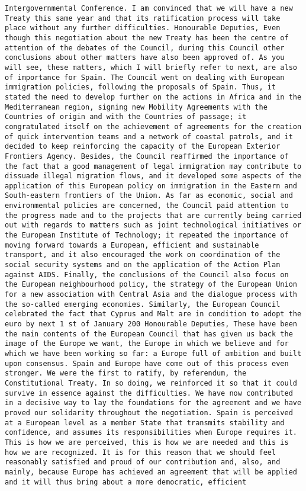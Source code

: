 \documentclass[
]{article}
\begin{document}
\begin{verbatim}
Intergovernmental Conference. I am convinced that we will have a new Treaty this same year and that its ratification process will take place without any further difficulties. Honourable Deputies, Even though this negotiation about the new Treaty has been the centre of attention of the debates of the Council, during this Council other conclusions about other matters have also been approved of. As you will see, these matters, which I will briefly refer to next, are also of importance for Spain. The Council went on dealing with European immigration policies, following the proposals of Spain. Thus, it stated the need to develop further on the actions in Africa and in the Mediterranean region, signing new Mobility Agreements with the Countries of origin and with the Countries of passage; it congratulated itself on the achievement of agreements for the creation of quick intervention teams and a network of coastal patrols, and it decided to keep reinforcing the capacity of the European Exterior Frontiers Agency. Besides, the Council reaffirmed the importance of the fact that a good management of legal immigration may contribute to dissuade illegal migration flows, and it developed some aspects of the application of this European policy on immigration in the Eastern and South-eastern frontiers of the Union. As far as economic, social and environmental policies are concerned, the Council paid attention to the progress made and to the projects that are currently being carried out with regards to matters such as joint technological initiatives or the European Institute of Technology; it repeated the importance of moving forward towards a European, efficient and sustainable transport, and it also encouraged the work on coordination of the social security systems and on the application of the Action Plan against AIDS. Finally, the conclusions of the Council also focus on the European neighbourhood policy, the strategy of the European Union for a new association with Central Asia and the dialogue process with the so-called emerging economies. Similarly, the European Council celebrated the fact that Cyprus and Malt are in condition to adopt the euro by next 1 st of January 200 Honourable Deputies, These have been the main contents of the European Council that has given us back the image of the Europe we want, the Europe in which we believe and for which we have been working so far: a Europe full of ambition and built upon consensus. Spain and Europe have come out of this process even stronger. We were the first to ratify, by referendum, the Constitutional Treaty. In so doing, we reinforced it so that it could survive in essence against the difficulties. We have now contributed in a decisive way to lay the foundations for the agreement and we have proved our solidarity throughout the negotiation. Spain is perceived at a European level as a member State that transmits stability and confidence, and assumes its responsibilities when Europe requires it. This is how we are perceived, this is how we are needed and this is how we are recognized. It is for this reason that we should feel reasonably satisfied and proud of our contribution and, also, and mainly, because Europe has achieved an agreement that will be applied and it will thus bring about a more democratic, efficient 
\end{verbatim}
\end{document}
